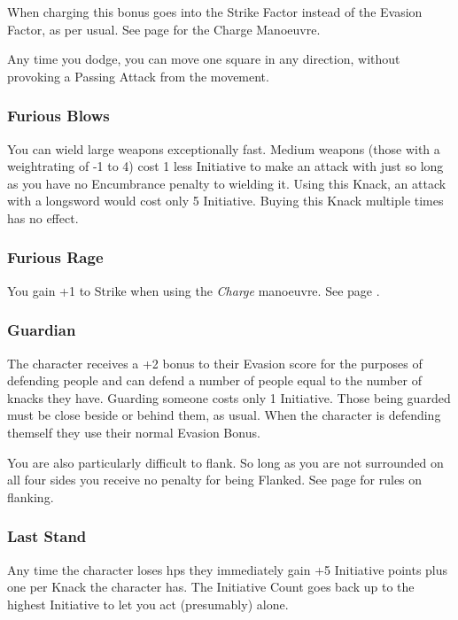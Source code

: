 \begin{multicols}{2}
When charging this bonus goes into the Strike Factor instead of the Evasion Factor, as per usual.
See page \pageref{charge} for the Charge Manoeuvre.

Any time you dodge, you can move one square in any direction, without provoking a Passing Attack from the movement.

\subsubsection{Furious Blows}\label{furiousblows}

You can wield large weapons exceptionally fast.
Medium weapons (those with a \gls{weightrating} of -1 to 4) cost 1 less Initiative to make an attack with just so long as you have no Encumbrance penalty to wielding it.
Using this Knack, an attack with a longsword would cost only 5 Initiative.
Buying this Knack multiple times has no effect.

\subsubsection{Furious Rage}

You gain +1 to Strike when using the \textit{Charge} manoeuvre.
See page \pageref{charge}.

\subsubsection{Guardian}

The character receives a +2 bonus to their Evasion score for the purposes of defending people and can defend a number of people equal to the number of knacks they have.
Guarding someone costs only 1 Initiative.
Those being guarded must be close beside or behind them, as usual.
When the character is defending themself they use their normal Evasion Bonus.

You are also particularly difficult to flank.
So long as you are not surrounded on all four sides you receive no penalty for being Flanked.
See page \pageref{flank} for rules on flanking.

\subsubsection{Last Stand}

Any time the character loses \glspl{hp} they immediately gain +5 Initiative points plus one per Knack the character has.
The Initiative Count goes back up to the highest Initiative to let you act (presumably) alone.


\end{multicols}

